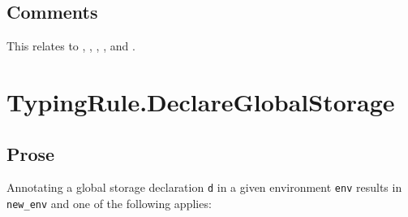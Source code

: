 \documentclass{book}
\begin{document}
\subsection{Comments}

This relates to , , , , and .

\section{TypingRule.DeclareGlobalStorage \label{sec:TypingRule.DeclareGlobalStorage}}
\subsection{Prose}
Annotating a global storage declaration \texttt{d} in a given environment \texttt{env} results
in \texttt{new\_env} and one of the following applies:
\end{document}

